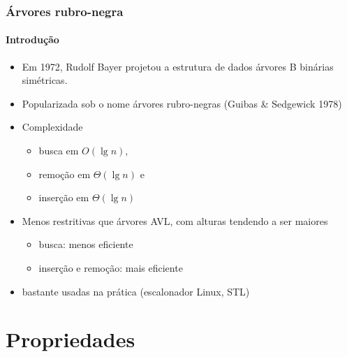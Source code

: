 \documentclass{beamer}
\begin{document}
\begin{frame}

  \frametitle{Árvores rubro-negra}
  \framesubtitle{Introdução}

  
  \begin{itemize}
    
  \item Em 1972, Rudolf Bayer projetou a estrutura de dados
    \alert{árvores B binárias simétricas}.

  \item Popularizada sob o nome árvores rubro-negras (Guibas \& Sedgewick 1978)

  \item Complexidade
    \begin{itemize}
    \item busca em $O(\lg n)$, 
    \item remoção em $\Theta(\lg n)$ e
    \item inserção em $\Theta(\lg n)$
    \end{itemize}

  \item Menos restritivas que árvores AVL, com alturas tendendo a ser maiores

    \begin{itemize}

      \item busca: menos eficiente

      \item inserção e remoção: mais eficiente

    \end{itemize}

  \item bastante usadas na prática (escalonador Linux, STL)

  \end{itemize}

\end{frame}

\section{Propriedades}
\end{document}
